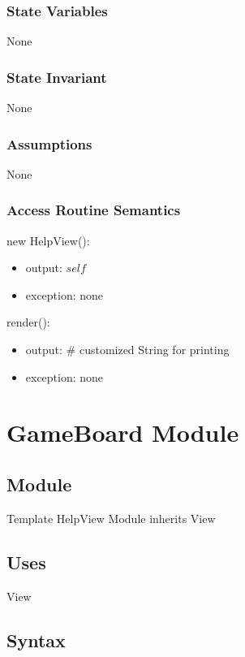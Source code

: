 \documentclass[12pt]{article}
\begin{document}
\subsubsection* {State Variables}

None

\subsubsection* {State Invariant}

None

\subsubsection* {Assumptions}

None

\subsubsection* {Access Routine Semantics}
new HelpView():
\begin{itemize}
\item output: $self$
\item exception: none
\end{itemize}
render():
\begin{itemize}
\item output: \# customized String for printing
\item exception: none
\end{itemize}

\newpage




\section* {GameBoard Module}

\subsection*{Module}

Template HelpView Module inherits View

\subsection* {Uses}

View

\subsection* {Syntax}
\end{document}
